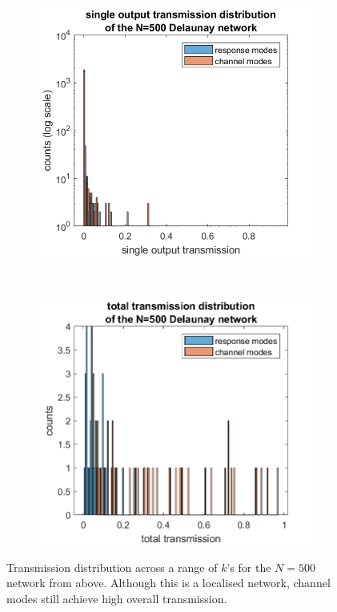 \begin{figure}[ht]
    \centering
    \begin{subfigure}[b]{0.4\textwidth}
        \includegraphics[width=\textwidth]{ch3/fig3/N500d_singleT.png}
    \end{subfigure}
~\quad\quad
    \begin{subfigure}[b]{0.4\textwidth}
        \includegraphics[width=\textwidth]{ch3/fig3/N500d_totalT.png}
    \end{subfigure}
    \caption{Transmission distribution across a range of $k$'s for the $N=500$ network from above. Although this is a localised network, channel modes still achieve high overall transmission.}\label{fig:N500_T_hist}
\end{figure}


